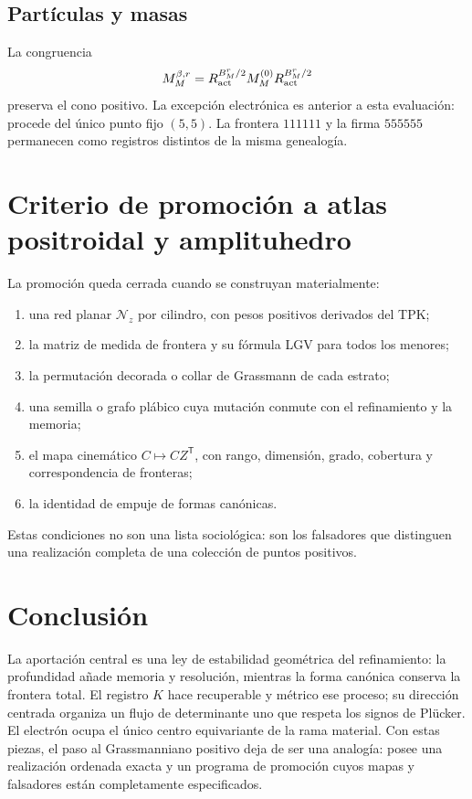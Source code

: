 \subsection{Partículas y masas}

La congruencia
\[
M_M^{\beta,r}
=R_{\rm act}^{B_M^r/2}M_M^{(0)}R_{\rm act}^{B_M^r/2}
\]
preserva el cono positivo. La excepción electrónica es anterior a esta
evaluación: procede del único punto fijo \((5,5)\). La frontera \(111111\) y
la firma \(555555\) permanecen como registros distintos de la misma genealogía.

\section{Criterio de promoción a atlas positroidal y amplituhedro}

La promoción queda cerrada cuando se construyan materialmente:
\begin{enumerate}
\item una red planar \(\mathcal N_z\) por cilindro, con pesos positivos
derivados del TPK;
\item la matriz de medida de frontera y su fórmula LGV para todos los menores;
\item la permutación decorada o collar de Grassmann de cada estrato;
\item una semilla o grafo plábico cuya mutación conmute con el refinamiento y
la memoria;
\item el mapa cinemático \(C\mapsto CZ^{\mathsf T}\), con rango, dimensión,
grado, cobertura y correspondencia de fronteras;
\item la identidad de empuje de formas canónicas.
\end{enumerate}
Estas condiciones no son una lista sociológica: son los falsadores que
distinguen una realización completa de una colección de puntos positivos.

\section{Conclusión}

La aportación central es una ley de estabilidad geométrica del refinamiento:
la profundidad añade memoria y resolución, mientras la forma canónica conserva
la frontera total. El registro \(K\) hace recuperable y métrico ese proceso;
su dirección centrada organiza un flujo de determinante uno que respeta los
signos de Plücker. El electrón ocupa el único centro equivariante de la rama material.
Con estas piezas, el paso al Grassmanniano positivo deja de ser una analogía:
posee una realización ordenada exacta y un programa de promoción cuyos mapas y
falsadores están completamente especificados.


